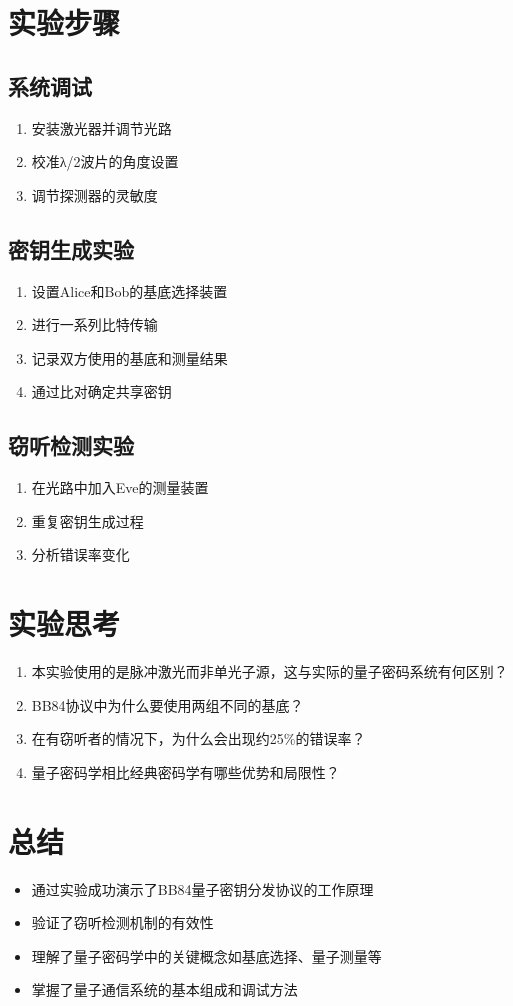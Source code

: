 \documentclass{ctexart}
\begin{document}
\section{实验步骤}
\subsection{系统调试}
\begin{enumerate}
\item 安装激光器并调节光路
\item 校准λ/2波片的角度设置
\item 调节探测器的灵敏度
\end{enumerate}

\subsection{密钥生成实验}
\begin{enumerate}
\item 设置Alice和Bob的基底选择装置
\item 进行一系列比特传输
\item 记录双方使用的基底和测量结果
\item 通过比对确定共享密钥
\end{enumerate}

\subsection{窃听检测实验}
\begin{enumerate}
\item 在光路中加入Eve的测量装置
\item 重复密钥生成过程
\item 分析错误率变化
\end{enumerate}

\section{实验思考}
\begin{enumerate}
\item 本实验使用的是脉冲激光而非单光子源，这与实际的量子密码系统有何区别？
\item BB84协议中为什么要使用两组不同的基底？
\item 在有窃听者的情况下，为什么会出现约25\%的错误率？
\item 量子密码学相比经典密码学有哪些优势和局限性？
\end{enumerate}

\section{总结}
\begin{itemize}
\item 通过实验成功演示了BB84量子密钥分发协议的工作原理
\item 验证了窃听检测机制的有效性
\item 理解了量子密码学中的关键概念如基底选择、量子测量等
\item 掌握了量子通信系统的基本组成和调试方法
\end{itemize}
\end{document}
